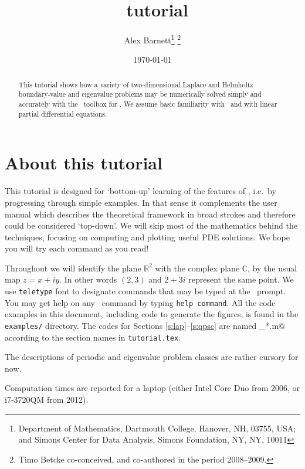 \documentclass[11pt]{article}
\begin{document}
\title{\mpspack\ tutorial}
\author{Alex Barnett\footnote{Department of Mathematics, Dartmouth College, Hanover, NH, 03755, USA; and Simons Center for Data Analysis, Simons Foundation, NY, NY, 10011} \footnote{Timo Betcke co-conceived, and co-authored in the period 2008--2009.}}

\date{\today}   %

\maketitle
\begin{abstract}
This tutorial shows how a variety of two-dimensional Laplace and Helmholtz
boundary-value and eigenvalue problems
may be numerically solved simply and accurately with the \mpspack\ toolbox
for \matlab. We assume basic familiarity with \matlab\
and with linear partial differential equations.
\end{abstract}

\setcounter{tocdepth}{2}
\tableofcontents

\section{About this tutorial}

This tutorial is designed for `bottom-up' learning of the features
of \mpspack, i.e.\ by progressing through simple examples.
In that sense it complements the user manual which describes
the theoretical framework in broad strokes and therefore could
be considered `top-down'.
We will skip most of the mathematics behind the techniques,
focusing on computing and plotting useful PDE solutions.
We hope you will try each command as you read!

Throughout we will identify the plane $\mathbb{R}^2$ with the complex
plane $\mathbb{C}$, by the usual map $z=x+iy$. In other words
$(2,3)$ and $2+3i$ represent the same point.
We use {\tt teletype} font to designate commands that may be typed
at the \matlab\ prompt.
You may get help on any \mpspack\ command by typing {\tt help command}.
All the code examples in this document, including code to generate the
figures, is found in the {\tt examples/} directory.
The codes for Sections \ref{s:lap}--\ref{s:qpsc} are named
\verb@tut_*.m@ according to the section names in {\tt tutorial.tex}.

The descriptions of periodic and eigenvalue problem classes are
rather cursory for now.

Computation times are reported for a laptop
(either Intel Core Duo from 2006, or i7-3720QM from 2012).











 

\end{document}
